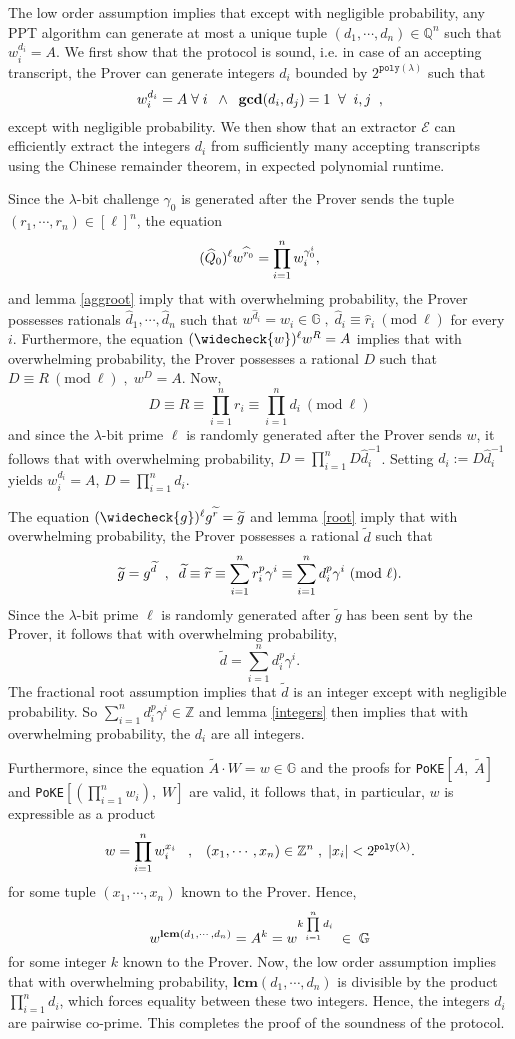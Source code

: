 \documentclass[11pt, lettersize, notitlepage, leqno, footskip=0.6cm]{article}
\newcommand{\bz}{\mathbb Z}
\newcommand{\bq}{\mathbb Q}
\newcommand{\pl}{\prod\limits}
\newcommand{\slim}{\sum\limits}
\newcommand{\ttt}{\texttt}
\newcommand{\bG}{\mathbb{G}}
\newcommand{\wti}{\widetilde}
\newcommand{\mc}{\mathcal}
\newcommand{\mbf}{\mathbf}
\newcommand{\lam}{\lambda}
\newcommand{\what}{\widehat}
\newcommand{\weck}{\widecheck}
\newcommand{\vs}{\vspace{-0.15cm}}
\newcommand{\op}{overwhelming probability}
\newcommand{\np}{negligible probability}
\newcommand{\Mod}[1]{\ (\mathrm{mod}\ #1)}
\newcommand{\LCM}{\mbf{lcm}}
\newcommand{\GCD}{\mbf{gcd}}
\newcommand{\E}{\mc{E}}
\numberwithin{equation}{section}
\begin{document}
\begin{prf} The low order assumption implies that except with \np, any PPT algorithm can generate at most a unique tuple $(d_1,\cdots,d_n)\in \bq^n$ such that $w_i^{d_i} = A$. We first show that the protocol is sound, i.e. in case of an accepting transcript, the Prover can generate integers $d_i$ bounded by $2^{\ttt{poly}(\lam)}$ such that \vs $$w_i^{d_i} = A\;\forall\; i\;\;\wedge\;\;\GCD(d_i,d_j) = 1\;\;\forall\;\; i,j\;\;,\vs $$ except with \np. We then show that an extractor $\E$ can efficiently extract the integers $d_i$ from sufficiently many accepting transcripts using the Chinese remainder theorem, in expected polynomial runtime.

Since the $\lam$-bit challenge $\gamma_{0}$ is generated after the Prover sends the tuple $(r_1,\cdots,r_n)\in[\ell]^n$, the equation \vs $$(\what{Q}_0)^{\ell}w^{\what{r}_0} = \pl_{i=1}^n w_i^{\gamma_{0}^i},\vs $$ and lemma \ref{aggroot} imply that with \op, the Prover possesses rationals $\what{d}_1,\cdots,\what{d}_n$ such that $w^{\what{d}_i} = w_i\in \bG\;,\;\what{d}_i\equiv \what{r}_i\Mod{\ell}$ for every $i$. Furthermore, the equation $(\weck{w})^{\ell}w^R = A$ implies that with \op, the Prover possesses a rational $D$ such that $D\equiv R\Mod{\ell}\;,\;w^{D} =A$. Now, \vs $$D\equiv R\equiv \pl_{i=1}^n r_i \equiv \pl_{i=1}^n d_i\Mod{\ell}$$ and since the $\lam$-bit prime $\ell$ is randomly generated after the Prover sends $w$, it follows that with \op, $D = \prod_{i=1}^n D\what{d}_i^{-1}$. Setting $d_i:= D\what{d}_i^{-1}$ yields $w_i^{d_i} = A$, $ D = \prod_{i=1}^n d_i.$  

The equation $(\weck{g})^{\ell}g^{\wti{r}}=\wti{g}$ and lemma \ref{root} imply that with \op, the Prover possesses a rational $\wti{d}$ such that \vspace{-0.2cm} $$\wti{g} = g^{\wti{d}}\;\;,\;\; \wti{d}\equiv \wti{r}\equiv\slim_{i=1}^n r_i^p\gamma^i\equiv \slim_{i=1}^n d_i^p\gamma^i \Mod{\ell}. \vs $$ Since the $\lam$-bit prime $\ell$ is randomly generated after $\wti{g}$ has been sent by the Prover, it follows that with \op, \vs $$\wti{d} = \slim_{i=1}^n d_i^p\gamma^i.  $$ The fractional root assumption implies that $\wti{d}$ is an integer except with \np. So $\sum_{i=1}^n d_i^p\gamma^i\in \bz$ and lemma \ref{integers} then implies that with \op, the $d_i$ are all integers. 

Furthermore, since the equation $\wti{A}\cdot W = w \in \bG$ and the proofs for \verb|PoKE|$[A,\;\wti{A}]$ and \verb|PoKE|$[(\prod_{i=1}^n w_i),\; W]$ are valid, it follows that, in particular, $w$ is expressible as a product \vs $$w =\pl_{i=1}^n w_i^{x_i}\;\;\;,\;\;\;(x_1,\cdots,x_n)\in\bz^n \;,\;|x_i|< 2^{\ttt{poly}(\lam)}.\vs $$ for some tuple $(x_1,\cdots,x_n)$ known to the Prover. Hence, \vs $$w^{\LCM(d_1,\cdots,d_n)} = A^k = w^{k\pl_{i=1}^n d_i}\;\in\;\bG \vs $$ for some integer $k$ known to the Prover. Now, the low order assumption implies that with \op, $\LCM(d_1,\cdots,d_n)$ is divisible by the product $\prod_{i=1}^n d_i$, which forces equality between these two integers. Hence, the integers $d_i$ are pairwise co-prime. This completes the proof of the soundness of the protocol.


\end{prf}
\end{document}
